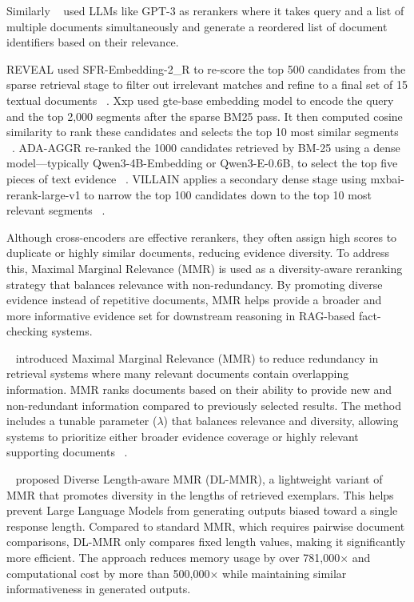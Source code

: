 Similarly ~\citet{Ma2023May} used LLMs like GPT-3 as rerankers  where it takes query and a list of multiple documents simultaneously and generate a reordered list of document identifiers based on their relevance.

REVEAL used SFR-Embedding-2\_R to re-score the top 500 candidates from the sparse retrieval stage to filter out irrelevant matches and refine to a final set of 15 textual documents ~\cite{Tariq2026Mar}. Xxp used gte-base embedding model to encode the query and the top 2,000 segments after the sparse BM25 pass. It then computed cosine similarity to rank these candidates and selects the top 10 most similar segments ~\cite{Tsoneva2026Mar}. ADA-AGGR re-ranked the 1000 candidates retrieved by BM-25 using a dense model—typically Qwen3-4B-Embedding or Qwen3-E-0.6B, to select the top five pieces of text evidence ~\cite{Upravitelev2026Mar}. VILLAIN applies a secondary dense stage using mxbai-rerank-large-v1 to narrow the top 100 candidates down to the top 10 most relevant segments ~\cite{Jung2026Mar}.

Although cross-encoders are effective rerankers, they often assign high scores to duplicate or highly similar documents, reducing evidence diversity. To address this, Maximal Marginal Relevance (MMR) is used as a diversity-aware reranking strategy that balances relevance with non-redundancy. By promoting diverse evidence instead of repetitive documents, MMR helps provide a broader and more informative evidence set for downstream reasoning in RAG-based fact-checking systems.

~\citet{Carbonell1998Aug} introduced Maximal Marginal Relevance (MMR) to reduce redundancy in retrieval systems where many relevant documents contain overlapping information. MMR ranks documents based on their ability to provide new and non-redundant information compared to previously selected results. The method includes a tunable parameter ($\lambda$) that balances relevance and diversity, allowing systems to prioritize either broader evidence coverage or highly relevant supporting documents ~\cite{Ullrich2024Nov}.


~\citet{Do2025Apr} proposed Diverse Length-aware MMR (DL-MMR), a lightweight variant of MMR that promotes diversity in the lengths of retrieved exemplars. This helps prevent Large Language Models from generating outputs biased toward a single response length. Compared to standard MMR, which requires pairwise document comparisons, DL-MMR only compares fixed length values, making it significantly more efficient. The approach reduces memory usage by over 781,000$\times$ and computational cost by more than 500,000$\times$ while maintaining similar informativeness in generated outputs.

